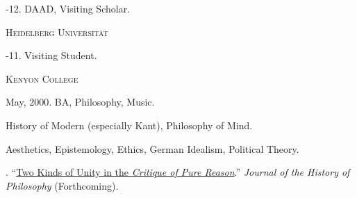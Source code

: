 \documentclass[11pt]{article}
\begin{document}
-12. DAAD, Visiting Scholar.

\medskip
\noindent\textsc{Heidelberg Universität\vspace{0.01in}}

-11. Visiting Student.

\medskip
\noindent\textsc{Kenyon College\vspace{0.02in}}

\ind May, 2000. BA, Philosophy, Music.

\bigskip
 

\medskip

\ind History of Modern (especially Kant), Philosophy of Mind.

\medskip

\medskip

\ind Aesthetics, Epistemology, Ethics, German Idealism, Political Theory.

\medskip






 
\normalsize

\medskip

\medskip

 

. ``\href{https://www.dropbox.com/s/rpey031drd2low5/KantUnity.pdf}{Two Kinds of Unity in the \emph{Critique of Pure Reason}}.'' \emph{Journal of the History of Philosophy} (Forthcoming).
\end{document}

